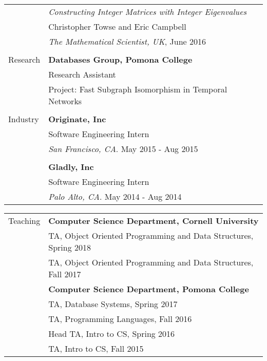 \documentclass[letterpaper,11pt,oneside]{article}
\begin{document}
\begin{tabular}{@{} l l}
    & \textit{Constructing Integer Matrices with Integer Eigenvalues} \\
    & Christopher Towse and Eric Campbell \\
    & \textit{The Mathematical Scientist, UK}, June 2016
 \\
    & \\


 
  \Large{Research}    & \textbf{Databases Group, Pomona College} \\ 
     & Research Assistant \\
     & Project: Fast Subgraph Isomorphism in Temporal Networks  \\
     & \\
  \Large{Industry} & \textbf{Originate, Inc} \\
     & Software Engineering Intern \\
     & \textit{San Francisco, CA}. May 2015 - Aug 2015 \\
     & \\
     & \textbf{Gladly, Inc} \\
     & Software Engineering Intern \\
     & \textit{Palo Alto, CA}. May 2014 - Aug 2014 \\
\end{tabular}

\begin{tabular}{@{} l l}  
  \Large{Teaching}     & \textbf{Computer Science Department, Cornell University}\\
  & TA, Object Oriented Programming and Data Structures, Spring 2018 \\
  & TA, Object Oriented Programming and Data Structures, Fall 2017 \\
  & \textbf{Computer Science Department, Pomona College} \\

     & TA, Database Systems, Spring 2017 \\

     & TA, Programming Languages, Fall 2016 \\

     & Head TA, Intro to CS, Spring 2016 \\

     & TA, Intro to CS, Fall 2015 \\


\end{tabular}
\end{document}
